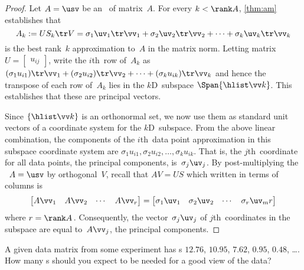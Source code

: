 \begin{proof} 
Let \(A=\usv\) be an \svd\ of matrix~\(A\).
For every \(k<\rank A\), \autoref{thm:am} establishes that 
\begin{equation*}
A_k:=US_k\tr V 
=\sigma_1\uv_1\tr\vv_1 +\sigma_2\uv_2\tr\vv_2+\cdots +\sigma_k\uv_k\tr\vv_k
\end{equation*}
is the best rank~\(k\) approximation to~\(A\) in the matrix norm.
Letting matrix \(U=\begin{bmatrix} u_{ij} \end{bmatrix}\), write the \(i\)th~row of~\(A_k\) as
\((\sigma_1u_{i1})\tr\vv_1 +(\sigma_2u_{i2})\tr\vv_2+\cdots +(\sigma_ku_{ik})\tr\vv_k\) and hence the transpose of each row of~\(A_k\) lies in the \(k\)D~subspace \(\Span\{\hlist\vv k\}\).
This establishes that these are principal vectors.

Since \(\{\hlist\vv k\}\) is an orthonormal set, we now use them as standard unit vectors of a coordinate system for the \(k\)D~subspace.
From the above linear combination, the components of the \(i\)th~data point approximation in this subspace coordinate system are \(\sigma_1u_{i1},\sigma_2u_{i2},\ldots,\sigma_ku_{ik}\).
That is, the \(j\)th~coordinate for all data points, the principal components, is~\(\sigma_j\uv_j\).
By post-multiplying the \svd\ \(A=\usv\) by orthogonal~\(V\), recall that \(AV=US\) which written in terms of columns is
\begin{equation*}
\begin{bmatrix} A\vv_1&A\vv_2&\cdots&A\vv_r \end{bmatrix}
=\begin{bmatrix} \sigma_1\uv_1&\sigma_2\uv_2&\cdots&\sigma_r\uv_mr\end{bmatrix}
\end{equation*}
where \(r=\rank A\)\,.  
Consequently, the vector~\(\sigma_j\uv_j\) of \(j\)th~coordinates in the subspace are equal to~\(A\vv_j\), the principal components.
\end{proof}




\begin{activity}
A given data matrix from some experiment has s \(12.76\), \(10.95\), \(7.62\), \(0.95\), \(0.48\), \ldots.  
How many s should you expect to be needed for a good view of the data?
\end{activity}






